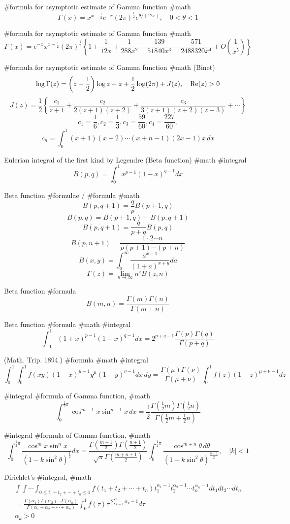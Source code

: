 #formula for asymptotic estimate of Gamma function #math
$$
\Gamma(x)=x^{x-\frac{1}{2}}e^{-x}(2\pi)^{\frac{1}{2}}e^{\theta/(12x)}, \quad 0<\theta<1
$$

#formula for asymptotic estimate of Gamma function #math
$$
\Gamma(x)=e^{-x}x^{x-\frac{1}{2}}(2\pi)^{\frac{1}{2}}\left\{1+\frac{1}{12x}+\frac{1}{288x^2}-\frac{139}{51840x^3}-\frac{571}{2488320x^4}+O\left(\frac{1}{x^5}\right)\right\}
$$

#formula for asymptotic estimate of Gamma function #math (Binet)
$$
\log\Gamma(z)=\left(z-\frac{1}{2}\right)\log z-z+\frac{1}{2}\log(2\pi)+J(z),\quad {\rm Re}(z)>0
$$
$$
J(z)=\frac{1}{2}\left\{\frac{c_1}{z+1}+\frac{c_2}{2(z+1)(z+2)}+\frac{c_3}{3(z+1)(z+2)(z+3)}+\cdots\right\}
$$
$$
c_1=\frac{1}{6},c_2=\frac{1}{3},c_3=\frac{59}{60},c_4=\frac{227}{60},
$$
$$
c_n=\int^1_0(x+1)(x+2)\cdots(x+n-1)(2x-1)x\,dx
$$

Eulerian integral of the first kind by Legendre (Beta function) #math #integral
$$
B(p,q)=\int^1_0x^{p-1}(1-x)^{q-1}dx
$$

Beta function #formulae / #formula #math
$$
B(p,q+1)=\frac{q}{p}B(p+1,q)
$$
$$
B(p,q)=B(p+1,q)+B(p,q+1)
$$
$$
B(p,q+1)=\frac{q}{p+q}B(p,q)
$$
$$
B(p,n+1)=\frac{1\cdot 2 \cdots n}{p(p+1)\cdots(p+n)}
$$
$$
B(x,y)=\int^\infty_0 \frac{a^{x-1}}{(1+a)^{x+y}} da
$$
$$
\Gamma(z)=\lim_{n\rightarrow\infty}n^z B(z,n)
$$

Beta function #formula
$$
B(m,n)=\frac{\Gamma(m)\Gamma(n)}{\Gamma(m+n)}
$$

Beta function #formula #math #integral
$$
\int^1_{-1}(1+x)^{p-1}(1-x)^{q-1}dx=2^{p+q-1}\frac{\Gamma(p)\Gamma(q)}{\Gamma(p+q)}
$$

(Math. Trip. 1894.) #formula #math #integral
$$
\int^1_0 \int^1_0f(xy)(1-x)^{\mu-1}y^\mu (1-y)^{\nu-1}dx\,dy=\frac{\Gamma(\mu)\Gamma(\nu)}{\Gamma(\mu+\nu)}\int^1_0f(z)(1-z)^{\mu+\nu-1}dz
$$

#integral #formula of Gamma function, #math
$$
\int^{\frac{1}{2}\pi}_0\cos^{m-1}x\sin^{n-1}x\,dx=\frac{1}{2}\frac{\Gamma(\frac{1}{2}m)\Gamma(\frac{1}{2}n)}{\Gamma(\frac{1}{2}m+\frac{1}{2}n)}
$$

#integral #formula of Gamma function, #math
$$
\int^{\frac{1}{2}\pi}_0\frac{\cos^{m}x\sin^{n}x}{(1-k\sin^2\theta)^{\frac{1}{2}}}dx=\frac{\Gamma(\frac{m+1}{2})\Gamma(\frac{n+1}{2})}{\sqrt{\pi}\Gamma(\frac{m+n+1}{2})}\int^{\frac{1}{2}\pi}_0\frac{\cos^{m+n}\theta\,d\theta}{(1-k\sin^2\theta)^{\frac{n+1}{2}}},\quad |k|<1
$$

Dirichlet’s #integral, #math
$$
\begin{array}{l}
\displaystyle\int\int\cdots\int_{0 \le t_1+t_2+\cdots+t_n\le 1}f(t_1+t_2+\cdots+t_n)t_1^{\alpha_1-1}t_2^{\alpha_2-1}\cdots t_n^{\alpha_n-1}dt_1 dt_2\cdots dt_n\\
\displaystyle=\frac{\Gamma(\alpha_1)\Gamma(\alpha_2)\cdots\Gamma(\alpha_n)}{\Gamma(\alpha_1+\alpha_2+\cdots+\alpha_n)}\int^1_0f(\tau)\tau^{\sum^n_{k=1}\alpha_k-1}d\tau \\
\alpha_k>0
\end{array}
$$

